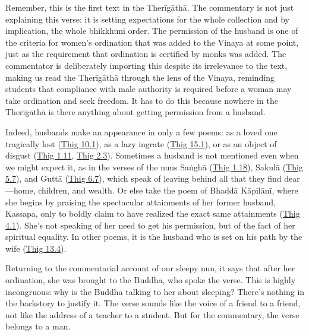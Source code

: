 \documentclass[12pt,openany]{book}%
\begin{document}
Remember, this is the first text in the \textsanskrit{Therīgāthā}. The commentary is not just explaining this verse: it is setting expectations for the whole collection and by implication, the whole bhikkhuni order. The permission of the husband is one of the criteria for women’s ordination that was added to the Vinaya at some point, just as the requirement that ordination is certified by monks was added. The commentator is deliberately importing this despite its irrelevance to the text, making us read the \textsanskrit{Therīgāthā} through the lens of the Vinaya, reminding students that compliance with male authority is required before a woman may take ordination and seek freedom. It has to do this because nowhere in the \textsanskrit{Therīgāthā} is there anything about getting permission from a husband.

Indeed, husbands make an appearance in only a few poems: as a loved one tragically lost (\href{https://suttacentral.net/thig10.1}{Thig 10.1}), as a lazy ingrate (\href{https://suttacentral.net/thig15.1}{Thig 15.1}), or as an object of disgust (\href{https://suttacentral.net/thig1.11}{Thig 1.11}, \href{https://suttacentral.net/thig2.3}{Thig 2.3}). Sometimes a husband is not mentioned even when we might expect it, as in the verses of the nuns \textsanskrit{Saṅghā} (\href{https://suttacentral.net/thig1.18}{Thig 1.18}), \textsanskrit{Sakulā} (\href{https://suttacentral.net/thig5.7}{Thig 5.7}), and \textsanskrit{Guttā} (\href{https://suttacentral.net/thig6.7}{Thig 6.7}), which speak of leaving behind all that they find dear—home, children, and wealth. Or else take the poem of \textsanskrit{Bhaddā} \textsanskrit{Kāpilānī}, where she begins by praising the spectacular attainments of her former husband, Kassapa, only to boldly claim to have realized the exact same attainments (\href{https://suttacentral.net/thig4.1}{Thig 4.1}). She’s not speaking of her need to get his permission, but of the fact of her spiritual equality. In other poems, it is the husband who is set on his path by the wife (\href{https://suttacentral.net/thig13.4}{Thig 13.4}).

Returning to the commentarial account of our sleepy nun, it says that after her ordination, she was brought to the Buddha, who spoke the verse. This is highly incongruous: why is the Buddha talking to her about sleeping? There’s nothing in the backstory to justify it. The verse sounds like the voice of a friend to a friend, not like the address of a teacher to a student. But for the commentary, the verse belongs to a man.
\end{document}
